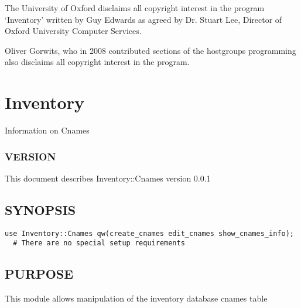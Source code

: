 \documentclass{book}
\begin{document}
The University of Oxford disclaims all copyright interest in the program `Inventory' written by Guy Edwards as agreed by Dr. Stuart Lee, Director of Oxford University Computer Services.



Oliver Gorwits, who in 2008 contributed sections of the hostgroups programming also disclaims all copyright interest in the program.




\section{Inventory}
\label{_Inventory::Cnames}
\hypertarget{_Inventory::Cnames}{}



Information on Cnames


\subsubsection{VERSION}
\label{Inventory::Cnames_VERSION}
\hypertarget{Inventory::Cnames_VERSION}{}



This document describes Inventory::Cnames version 0.0.1


\subsection{SYNOPSIS}
\label{Inventory::Cnames_SYNOPSIS}
\hypertarget{Inventory::Cnames_SYNOPSIS}{}


\begin{Verbatim}[fontfamily=courier,gobble=1,frame=lines,fontsize=\footnotesize]
  use Inventory::Cnames qw(create_cnames edit_cnames show_cnames_info);
  # There are no special setup requirements
\end{Verbatim}


\subsection{PURPOSE}
\label{Inventory::Cnames_PURPOSE}
\hypertarget{Inventory::Cnames_PURPOSE}{}



This module allows manipulation of the inventory database cnames table
\end{document}
